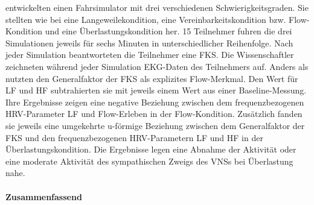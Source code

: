 entwickelten einen Fahrsimulator mit drei verschiedenen Schwierigkeitsgraden. Sie stellten wie bei \citet{Keller2011} eine Langeweilekondition, eine Vereinbarkeitskondition bzw. Flow-Kondition und eine Überlastungskondition her. 15 Teilnehmer fuhren die drei Simulationen jeweils für sechs Minuten in unterschiedlicher Reihenfolge. Nach jeder Simulation beantworteten die Teilnehmer eine \ac{FKS}. Die Wissenschaftler zeichneten während jeder Simulation \ac{EKG}-Daten des Teilnehmers auf. Anders als \citet{Peifer2014} nutzten \citet{Tozman2015} den Generalfaktor der \ac{FKS} als explizites Flow-Merkmal. Den Wert für \ac{LF} und \ac{HF} subtrahierten sie mit jeweils einem Wert aus einer Baseline-Messung. Ihre Ergebnisse zeigen eine negative Beziehung zwischen dem frequenzbezogenen \ac{HRV}-Parameter \ac{LF} und Flow-Erleben in der Flow-Kondition. Zusätzlich fanden sie jeweils eine umgekehrte u-förmige Beziehung zwischen dem Generalfaktor der \ac{FKS} und den frequenzbezogenen \ac{HRV}-Parametern \ac{LF} und \ac{HF} in der Überlastungskondition. Die Ergebnisse legen eine Abnahme der Aktivität oder eine moderate Aktivität des sympathischen Zweigs des \ac{VNS}s bei Überlastung nahe.

\paragraph{Zusammenfassend} 


